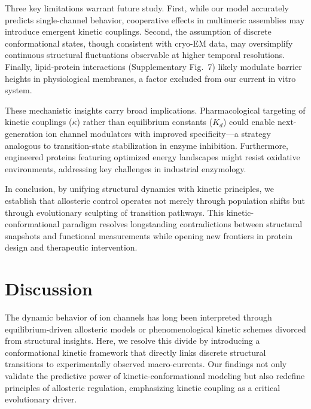 \documentclass[a4paper,12pt]{article}
\begin{document}
	Three key limitations warrant future study. First, while our model accurately predicts single-channel behavior, cooperative effects in multimeric assemblies may introduce emergent kinetic couplings. Second, the assumption of discrete conformational states, though consistent with cryo-EM data, may oversimplify continuous structural fluctuations observable at higher temporal resolutions. Finally, lipid-protein interactions (Supplementary Fig.~7) likely modulate barrier heights in physiological membranes, a factor excluded from our current in vitro system.  
	
	These mechanistic insights carry broad implications. Pharmacological targeting of kinetic couplings ($\kappa$) rather than equilibrium constants ($K_d$) could enable next-generation ion channel modulators with improved specificity—a strategy analogous to transition-state stabilization in enzyme inhibition. Furthermore, engineered proteins featuring optimized energy landscapes might resist oxidative environments, addressing key challenges in industrial enzymology.  
	
	In conclusion, by unifying structural dynamics with kinetic principles, we establish that allosteric control operates not merely through population shifts but through evolutionary sculpting of transition pathways. This kinetic-conformational paradigm resolves longstanding contradictions between structural snapshots and functional measurements while opening new frontiers in protein design and therapeutic intervention.  
	
	\section{Discussion}
	The dynamic behavior of ion channels has long been interpreted through equilibrium-driven allosteric models or phenomenological kinetic schemes divorced from structural insights. Here, we resolve this divide by introducing a conformational kinetic framework that directly links discrete structural transitions to experimentally observed macro-currents. Our findings not only validate the predictive power of kinetic-conformational modeling but also redefine principles of allosteric regulation, emphasizing kinetic coupling as a critical evolutionary driver.  

	
\end{document}

